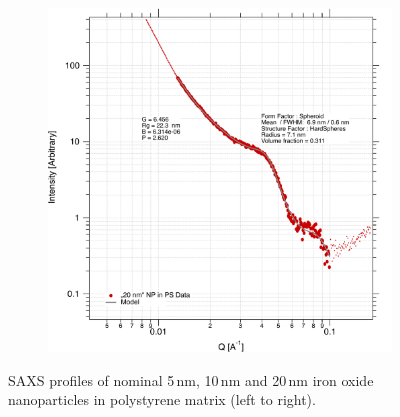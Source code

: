 \begin{figure}[tp]
\begin{subfigure}[b]{0.3\textwidth}
	\end{subfigure}
	\begin{subfigure}[b]{0.3\textwidth}
		\includegraphics[width=\linewidth]{images/ps20.pdf}
	\end{subfigure}

	\caption[SAXS profile of iron oxide nanoparticles in polystyrene matrix]{SAXS profiles of nominal 5\,nm, 10\,nm and 20\,nm iron oxide nanoparticles in polystyrene matrix (left to right).}
	\label{fig:saxsps}
\end{figure}
